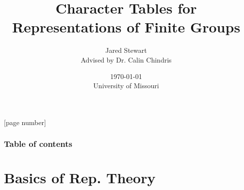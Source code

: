 %
% 




[page number]{}%

\newtheorem{proposition}[theorem]{Proposition} 


\title{Character Tables for Representations of Finite Groups}  
\author{Jared Stewart \\Advised by Dr. Calin Chindris }

\date{\today \\ University of Missouri} 



\begin{frame}
\titlepage
\end{frame}

\begin{frame}\frametitle{Table of contents}\tableofcontents
\end{frame} 

\section{Basics of Rep. Theory}
